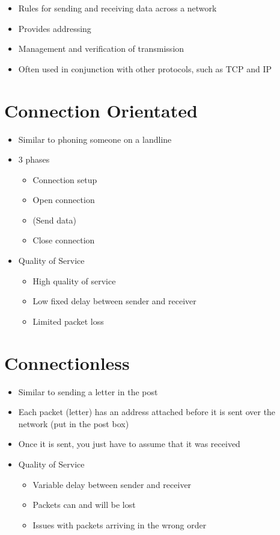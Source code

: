 
\begin{itemize}
  \item Rules for sending and receiving data across a network
  \item Provides addressing
  \item Management and verification of transmission
  \item Often used in conjunction with other protocols, such as TCP and IP
\end{itemize}

\section*{Connection Orientated}

\begin{itemize}
  \item Similar to phoning someone on a landline
  \item 3 phases
  \begin{itemize}
    \item Connection setup
    \item Open connection
    \item (Send data)
    \item Close connection
  \end{itemize}
  \item Quality of Service
  \begin{itemize}
    \item High quality of service
    \item Low fixed delay between sender and receiver
    \item Limited packet loss
  \end{itemize}
\end{itemize}

\section*{Connectionless}

\begin{itemize}
  \item Similar to sending a letter in the post
  \item Each packet (letter) has an address attached before it is sent over the network (put in the post box)
  \item Once it is sent, you just have to assume that it was received
  \item Quality of Service
  \begin{itemize}
    \item Variable delay between sender and receiver
    \item Packets can and will be lost
    \item Issues with packets arriving in the wrong order
  \end{itemize}
\end{itemize}

